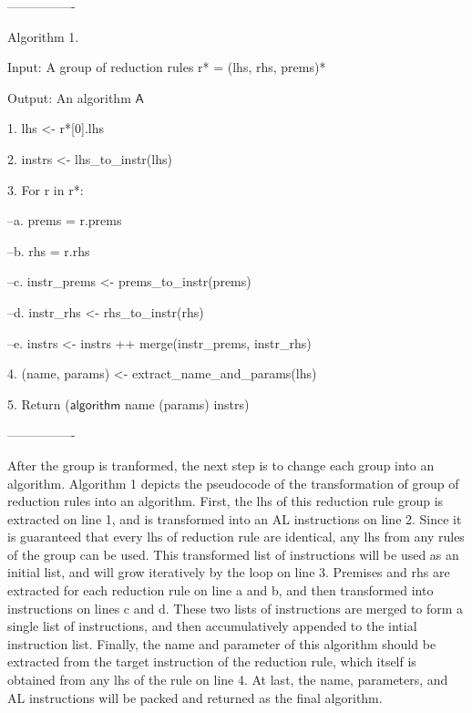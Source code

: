 ----------------

Algorithm 1.

Input: A group of reduction rules r* = (lhs, rhs, prems)*

Output: An algorithm $\mathsf{A}$

1. lhs <- r*[0].lhs

2. instrs <- lhs\_to\_instr(lhs)

3. For r in r*:

--a. prems = r.prems

--b. rhs = r.rhs

--c. instr\_prems <- prems\_to\_instr(prems)

--d. instr\_rhs <- rhs\_to\_instr(rhs)

--e. instrs <- instrs ++ merge(instr\_prems, instr\_rhs)

4. (name, params) <- extract\_name\_and\_params(lhs)

5. Return ($\mathsf{algorithm}$ name (params) {instrs})

----------------



After the group is tranformed, the next step is to
change each group into an algorithm. Algorithm 1 depicts the pseudocode of the transformation
of group of reduction rules into an algorithm.
First, the lhs of this reduction rule group is extracted on line 1, and is transformed into
an AL instructions on line 2. Since it is guaranteed that every lhs of reduction rule are
identical, any lhs from any rules of the group can be used. This transformed list of instructions
will be used as an initial list, and will grow iteratively by the loop on line 3.
Premises and rhs are extracted for each reduction rule on line a and b, and then transformed into
instructions on lines c and d. These two lists of instructions are merged to form a single
list of instructions, and then accumulatively appended to the intial instruction list.
Finally, the name and parameter of this algorithm should be extracted from the target instruction of the reduction rule,
which itself is obtained from any lhs of the rule on line 4. At last, the name, parameters, and
AL instructions will be packed and returned as the final algorithm.

